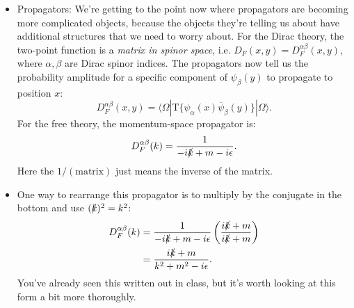 \documentclass[12pt, oneside]{article}   	%
\theoremstyle{definition}
\begin{document}
\begin{itemize}
	\item Propagators: We're getting to the point now where propagators are becoming more complicated objects, because the objects they're telling us about have additional structures that we need to worry about. For the Dirac theory, the two-point function is a \textit{matrix in spinor space}, i.e. $D_F(x, y) = D_F^{\alpha\beta}(x, y)$, where $\alpha, \beta$ are Dirac spinor indices. The propagators now tell us the probability amplitude for a specific component of $\psi_\beta(y)$ to propagate to position $x$:
	\begin{equation}
		D_F^{\alpha\beta}(x, y) = \langle \Omega | \mathrm{T}\{ \psi_\alpha(x) \overline\psi_\beta(y) \} |\Omega\rangle. \label{eq:prop_dfn}
	\end{equation}
	For the free theory, the momentum-space propagator is:
	\begin{equation}
		D_F^{\alpha\beta}(k) = \frac{1}{-i\slashed{k} + m - i\epsilon}.
	\end{equation}
	Here the $1 / (\mathrm{matrix})$ just means the inverse of the matrix. 
	\item One way to rearrange this propagator is to multiply by the conjugate in the bottom and use $(\slashed k)^2 = k^2$:
	\begin{align}\begin{split}
		D_F^{\alpha\beta}(k) &= \frac{1}{-i\slashed{k} + m - i\epsilon} \left(\frac{i\slashed k + m}{i\slashed k + m}\right) \\
		&= \frac{i\slashed k + m}{k^2 + m^2 - i\epsilon}.
	\end{split} \end{align}
	You've already seen this written out in class, but it's worth looking at this form a bit more thoroughly. 
	

\end{itemize}
\end{document}
